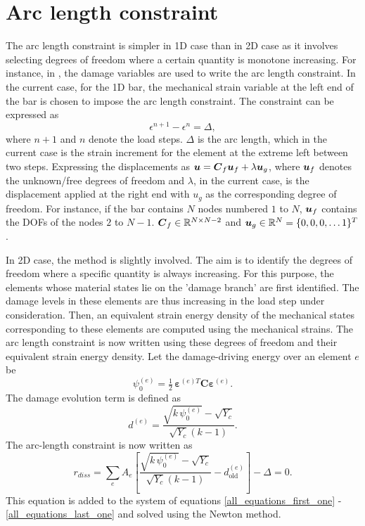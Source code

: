 \documentclass[10pt,review]{cas-sc}
\begin{document}
\section{Arc length constraint\label{appen_arc_length}}
The arc length constraint is simpler in 1D case than in 2D case as it involves selecting degrees of freedom where a certain quantity is monotone increasing. For instance, in \cite{Bharali2022,Singh2016}, the damage variables are used to write the arc length constraint. In the current case, for the 1D bar, the mechanical strain variable at the left end of the bar is chosen to impose the arc length constraint. The constraint can be expressed as
\begin{equation}
	\epsilon^{n+1} - \epsilon^{n} = \Delta, \label{onedarclength}
\end{equation}
where $n+1$ and $n$ denote the load steps. $\Delta$ is the arc length, which in the current case is the strain increment for the element at the extreme left between two steps. Expressing the displacements as $\mbox{\boldmath $u$} = \mbox{\boldmath $C$}_f \mbox{\boldmath $u$}_f + \lambda \mbox{\boldmath $u$}_g$, where $\mbox{\boldmath $u$}_f$ denotes the unknown/free degrees of freedom and $\lambda$, in the current case, is the displacement applied at the right end with $u_g$ as the corresponding degree of freedom. For instance, if the bar contains $N$ nodes numbered $1$ to $N$, $\mbox{\boldmath $u$}_f$ contains the DOFs of the nodes $2$ to $N-1$. $\mbox{\boldmath $C$}_f \in \mathbb{R}^{N \times N-2}$ and $\mbox{\boldmath $u$}_g \in \mathbb{R}^N = \{0,0,0,\dots 1\}^T$.

In 2D case, the method is slightly involved. The aim is to identify the degrees of freedom where a specific quantity is always increasing. For this purpose, the elements whose material states lie on the 'damage branch' are first identified. The damage levels in these elements are thus increasing in the load step under consideration. Then, an equivalent strain energy density of the mechanical states corresponding to these elements are computed using the mechanical strains. The arc length constraint is now written using these degrees of freedom and their equivalent strain energy density. 
Let the damage-driving energy over an element $e$ be
\begin{equation}
	\psi_0^{(e)} = \tfrac{1}{2}\,\boldsymbol{\varepsilon}^{(e)T}\mathbf{C}\boldsymbol{\varepsilon}^{(e)}. \label{undamaged_energy_func}
\end{equation}
The damage evolution term is defined as
\begin{equation}
	d^{(e)} = \frac{\sqrt{k\,\psi_0^{(e)}} - \sqrt{Y_c}}{\sqrt{Y_c}(k-1)}.
\end{equation}
The arc-length constraint is now written as
\begin{equation}
	r_{diss} = \sum_e A_e
	\left[
	\frac{\sqrt{k\,\psi_0^{(e)}} - \sqrt{Y_c}}{\sqrt{Y_c}(k-1)}
	- d^{(e)}_{\text{old}}
	\right] - \Delta = 0.
\end{equation}
This equation is added to the system of equations \ref{all_equations_first_one} - \ref{all_equations_last_one} and solved using the Newton method.
\end{document}
